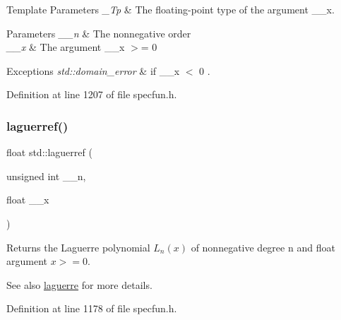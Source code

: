 \begin{DoxyTemplParams}{Template Parameters}
{\em \+\_\+\+Tp} & The floating-\/point type of the argument {\ttfamily \+\_\+\+\_\+x}. \\
\hline
\end{DoxyTemplParams}

\begin{DoxyParams}{Parameters}
{\em \+\_\+\+\_\+n} & The nonnegative order \\
\hline
{\em \+\_\+\+\_\+x} & The argument {\ttfamily  \+\_\+\+\_\+x $>$= 0 } \\
\hline
\end{DoxyParams}

\begin{DoxyExceptions}{Exceptions}
{\em std\+::domain\+\_\+error} & if {\ttfamily  \+\_\+\+\_\+x $<$ 0 }. \\
\hline
\end{DoxyExceptions}


Definition at line 1207 of file specfun.\+h.

\mbox{\label{group__mathsf__std_gada763419b0e21b38e38daa8b6eb56a8c}} 
\subsubsection{\texorpdfstring{laguerref()}{laguerref()}}
{\footnotesize\ttfamily float std\+::laguerref (\begin{DoxyParamCaption}\item[{unsigned int}]{\+\_\+\+\_\+n,  }\item[{float}]{\+\_\+\+\_\+x }\end{DoxyParamCaption})\hspace{0.3cm}{\ttfamily [inline]}}

Returns the Laguerre polynomial $ L_n(x) $ of nonnegative degree {\ttfamily n} and {\ttfamily float} argument $ x >= 0 $.

\begin{DoxySeeAlso}{See also}
\hyperlink{group__mathsf__std_ga9d7b24a11dad27690387405548973ef9}{laguerre} for more details. 
\end{DoxySeeAlso}


Definition at line 1178 of file specfun.\+h.

